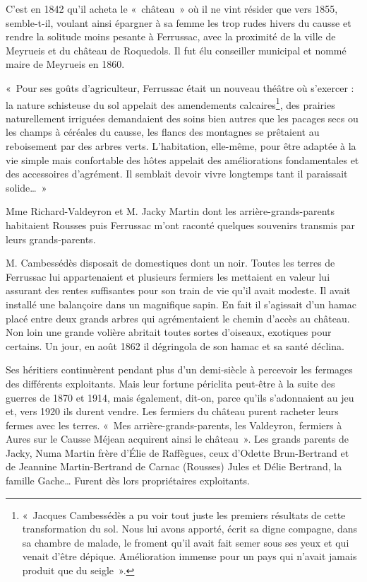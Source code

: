 C’est en 1842 qu’il acheta le «~château~» où il ne vint résider que vers 1855, semble-t-il, voulant ainsi
épargner à sa femme les trop rudes hivers du causse et rendre la solitude moins pesante à Ferrussac,
avec la proximité de la ville de Meyrueis et du château de Roquedols.
Il fut élu conseiller municipal et nommé maire de Meyrueis en 1860.

«~Pour ses goûts d’agriculteur, Ferrussac était un nouveau théâtre où s’exercer : la nature
schisteuse du sol appelait des amendements calcaires\footnote{«~Jacques Cambessédès a pu voir tout juste les premiers résultats de cette transformation du sol. Nous lui avons apporté, écrit sa digne compagne, dans sa chambre de malade, le froment qu’il avait fait semer sous ses yeux et qui venait d’être dépique. Amélioration immense pour un pays qui n’avait jamais produit que du seigle~».}, des prairies naturellement irriguées
demandaient des soins bien autres que les pacages secs ou les champs à céréales du causse,
les flancs des montagnes se prêtaient au reboisement par des arbres verts.
L’habitation, elle-même, pour être adaptée à la vie simple mais confortable des hôtes appelait
des améliorations fondamentales et des accessoires d’agrément. Il semblait devoir vivre
longtemps tant il paraissait solide…~»

Mme Richard-Valdeyron et M. Jacky Martin dont les arrière-grands-parents habitaient Rousses puis Ferrussac
m’ont raconté quelques souvenirs transmis par leurs grands-parents.

\begin{tcolorbox}
M. Cambessédès disposait de domestiques dont un noir. Toutes les terres de Ferrussac lui appartenaient et
plusieurs fermiers les mettaient en valeur lui assurant des rentes suffisantes pour son train de vie qu’il avait
modeste. Il avait installé une balançoire dans un magnifique sapin. En fait il s’agissait d’un hamac placé entre
deux grands arbres qui agrémentaient le chemin d’accès au château. Non loin une grande volière abritait
toutes sortes d’oiseaux, exotiques pour certains. Un jour, en août 1862 il dégringola de son hamac et sa santé
déclina.

Ses héritiers continuèrent pendant plus d’un demi-siècle à percevoir les fermages des différents exploitants. Mais
leur fortune périclita peut-être à la suite des guerres de 1870 et 1914, mais également, dit-on, parce qu’ils
s’adonnaient au jeu et, vers 1920 ils durent vendre.
Les fermiers du château purent racheter leurs fermes avec les terres.
«~Mes arrière-grands-parents, les Valdeyron, fermiers à Aures sur le Causse Méjean acquirent ainsi le château~».
Les grands parents de Jacky, Numa Martin frère d’Élie de Raffègues, ceux d’Odette Brun-Bertrand et de
Jeannine Martin-Bertrand de Carnac (Rousses) Jules et Délie Bertrand, la famille Gache… Furent dès lors
propriétaires exploitants.
\end{tcolorbox}

